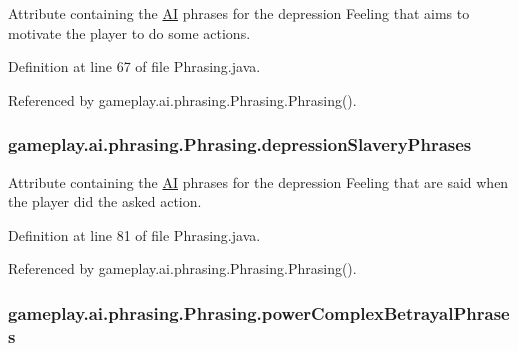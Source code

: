 Attribute containing the \hyperlink{classgameplay_1_1ai_1_1_a_i}{A\-I} phrases for the depression Feeling that aims to motivate the player to do some actions. 



Definition at line 67 of file Phrasing.\-java.



Referenced by gameplay.\-ai.\-phrasing.\-Phrasing.\-Phrasing().

\hypertarget{classgameplay_1_1ai_1_1phrasing_1_1_phrasing_ab8f4fdd33f163351fb6ff578cb950a44}{
\subsubsection[{depression\-Slavery\-Phrases}]{ gameplay.\-ai.\-phrasing.\-Phrasing.\-depression\-Slavery\-Phrases\hspace{0.3cm}{\ttfamily [protected]}}}\label{classgameplay_1_1ai_1_1phrasing_1_1_phrasing_ab8f4fdd33f163351fb6ff578cb950a44}


Attribute containing the \hyperlink{classgameplay_1_1ai_1_1_a_i}{A\-I} phrases for the depression Feeling that are said when the player did the asked action. 



Definition at line 81 of file Phrasing.\-java.



Referenced by gameplay.\-ai.\-phrasing.\-Phrasing.\-Phrasing().

\hypertarget{classgameplay_1_1ai_1_1phrasing_1_1_phrasing_a77e67b74525c919463d3c9b830fe895d}{
\subsubsection[{power\-Complex\-Betrayal\-Phrases}]{ gameplay.\-ai.\-phrasing.\-Phrasing.\-power\-Complex\-Betrayal\-Phrases\hspace{0.3cm}{\ttfamily [protected]}}}\label{classgameplay_1_1ai_1_1phrasing_1_1_phrasing_a77e67b74525c919463d3c9b830fe895d}


